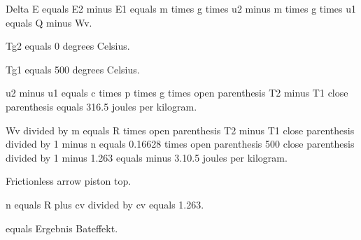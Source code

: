 Delta E equals E2 minus E1 equals m times g times u2 minus m times g times u1 equals Q minus Wv.

Tg2 equals 0 degrees Celsius.

Tg1 equals 500 degrees Celsius.

u2 minus u1 equals c times p times g times open parenthesis T2 minus T1 close parenthesis equals 316.5 joules per kilogram.

Wv divided by m equals R times open parenthesis T2 minus T1 close parenthesis divided by 1 minus n equals 0.16628 times open parenthesis 500 close parenthesis divided by 1 minus 1.263 equals minus 3.10.5 joules per kilogram.

Frictionless arrow piston top.

n equals R plus cv divided by cv equals 1.263.

equals Ergebnis Bateffekt.